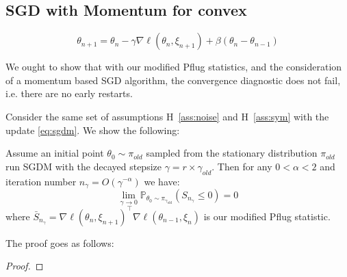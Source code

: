 \documentclass{article}
\begin{document}
\subsection{SGD with Momentum for convex}
\begin{equation}\label{eq:sgdm}
\theta_{n+1} = \theta_{n} - \gamma \nabla \ell ( \theta_{n}, \xi_{n+1} ) + \beta ( \theta_{n} - \theta_{n-1} )
\end{equation}

We ought to show that with our modified Pflug statistics, and the consideration of a momentum based SGD algorithm, the convergence diagnostic does not fail, i.e. there are no early restarts.

Consider the same set of assumptions H~\ref{ass:noise} and H~\ref{ass:sym} with the update \eqref{eq:sgdm}.
We show the following:
\begin{Prop}
Assume an initial point $\theta_0 \sim \pi_{old}$ sampled from the stationary distribution $\pi_{old}$ run SGDM with the decayed stepsize $\gamma = r \times \gamma_{old}$.
Then for any $0<\alpha<2$ and iteration number $n_{\gamma} = O(\gamma^{-\alpha})$ we have:
$$
\lim _{\gamma \rightarrow 0} \mathbb{P}_{\theta_{0} \sim \pi_{\gamma_{\text {old}}}}\left(S_{n_{\gamma}} \leq 0\right)= 0
$$
where $\bar{S}_{n_{\gamma}} = \nabla \ell (\theta_n, \xi_{n+1})^\top \nabla \ell (\theta_{n-1}, \xi_n)$ is our modified Pflug statistic.
\end{Prop}

The proof goes as follows:

\begin{proof}

\end{proof}



\newpage





\end{document}
